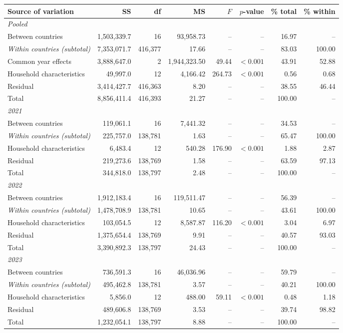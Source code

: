 \begin{tabular}{lrrrrrrr}
\toprule
Source of variation & SS & df & MS & $F$ & $p$-value & \% total & \% within \\
\midrule
\multicolumn{8}{l}{\textit{Pooled}} \\
Between countries & 1,503,339.7 & 16 & 93,958.73 & -- & -- & 16.97 & -- \\
\textit{Within countries (subtotal)} & 7,353,071.7 & 416,377 & 17.66 & -- & -- & 83.03 & 100.00 \\
Common year effects & 3,888,647.0 & 2 & 1,944,323.50 & 49.44 & $<0.001$ & 43.91 & 52.88 \\
Household characteristics & 49,997.0 & 12 & 4,166.42 & 264.73 & $<0.001$ & 0.56 & 0.68 \\
Residual & 3,414,427.7 & 416,363 & 8.20 & -- & -- & 38.55 & 46.44 \\
Total & 8,856,411.4 & 416,393 & 21.27 & -- & -- & 100.00 & -- \\
\midrule
\multicolumn{8}{l}{\textit{2021}} \\
Between countries & 119,061.1 & 16 & 7,441.32 & -- & -- & 34.53 & -- \\
\textit{Within countries (subtotal)} & 225,757.0 & 138,781 & 1.63 & -- & -- & 65.47 & 100.00 \\
Household characteristics & 6,483.4 & 12 & 540.28 & 176.90 & $<0.001$ & 1.88 & 2.87 \\
Residual & 219,273.6 & 138,769 & 1.58 & -- & -- & 63.59 & 97.13 \\
Total & 344,818.0 & 138,797 & 2.48 & -- & -- & 100.00 & -- \\
\midrule
\multicolumn{8}{l}{\textit{2022}} \\
Between countries & 1,912,183.4 & 16 & 119,511.47 & -- & -- & 56.39 & -- \\
\textit{Within countries (subtotal)} & 1,478,708.9 & 138,781 & 10.65 & -- & -- & 43.61 & 100.00 \\
Household characteristics & 103,054.5 & 12 & 8,587.87 & 116.20 & $<0.001$ & 3.04 & 6.97 \\
Residual & 1,375,654.4 & 138,769 & 9.91 & -- & -- & 40.57 & 93.03 \\
Total & 3,390,892.3 & 138,797 & 24.43 & -- & -- & 100.00 & -- \\
\midrule
\multicolumn{8}{l}{\textit{2023}} \\
Between countries & 736,591.3 & 16 & 46,036.96 & -- & -- & 59.79 & -- \\
\textit{Within countries (subtotal)} & 495,462.8 & 138,781 & 3.57 & -- & -- & 40.21 & 100.00 \\
Household characteristics & 5,856.0 & 12 & 488.00 & 59.11 & $<0.001$ & 0.48 & 1.18 \\
Residual & 489,606.8 & 138,769 & 3.53 & -- & -- & 39.74 & 98.82 \\
Total & 1,232,054.1 & 138,797 & 8.88 & -- & -- & 100.00 & -- \\
\bottomrule
\end{tabular}
